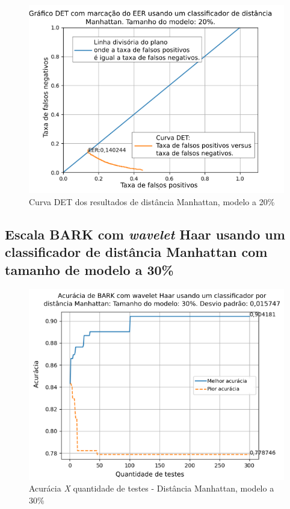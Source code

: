 \begin{figure}[!h]
	\centering
	\includegraphics[width=.9\linewidth]{images/results/det/DET_for_classifier_Manhattan_20}
	\caption{Curva DET dos resultados de distância Manhattan, modelo a 20\%}
	\label{fig:detforclassifiermanhattan20}
\end{figure}

\subsection{Escala BARK com \textit{wavelet} Haar usando um classificador de distância Manhattan com tamanho de modelo a 30\%}



\begin{figure}[ht]
	\centering
	\includegraphics[width=\linewidth]{images/results/confusionMatrices/classifier_Manhattan_30.png}
	\caption{Acurácia \textit{X} quantidade de testes - Distância Manhattan, modelo a 30\%}
	\label{fig:classifiermanhattan30}
\end{figure}

